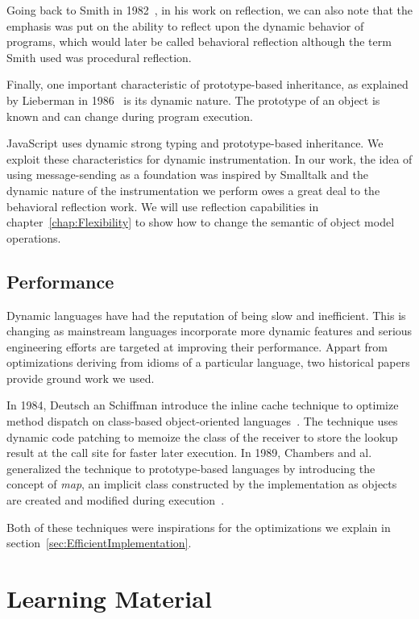 Going back to Smith in 1982~\cite{Smith:1982}, in his work on reflection, we
can also note that the emphasis was put on the ability to reflect upon the
dynamic behavior of programs, which would later be called behavioral reflection
although the term Smith used was procedural reflection.

Finally, one important characteristic of prototype-based inheritance, as
explained by Lieberman in 1986~\cite{Lieberman:1986} is its dynamic nature. The
prototype of an object is known and can change during program execution.

JavaScript uses dynamic strong typing and prototype-based inheritance.  We
exploit these characteristics for dynamic instrumentation. In our work, the
idea of using message-sending as a foundation was inspired by Smalltalk  and
the dynamic nature of the instrumentation we perform owes a great deal to the
behavioral reflection work. We will use reflection capabilities in
chapter~\ref{chap:Flexibility} to show how to change the semantic of object
model operations.

\subsection{Performance}

Dynamic languages have had the reputation of being slow and inefficient. This
is changing as mainstream languages incorporate more dynamic features and
serious engineering efforts are targeted at improving their performance. Appart
from optimizations deriving from idioms of a particular language, two historical
papers provide ground work we used.

In 1984, Deutsch an Schiffman introduce the inline cache technique to optimize
method dispatch on class-based object-oriented languages~\cite{Deutsch:1984}.
The technique uses dynamic code patching to memoize the class of the receiver
to store the lookup result at the call site for faster later execution. In
1989, Chambers and al. generalized the technique to prototype-based languages
by introducing the concept of \textit{map}, an implicit class constructed by
the implementation as objects are created and modified during
execution~\cite{self}.

Both of these techniques were inspirations for the optimizations we explain in
section~\ref{sec:EfficientImplementation}.

\section{Learning Material}

